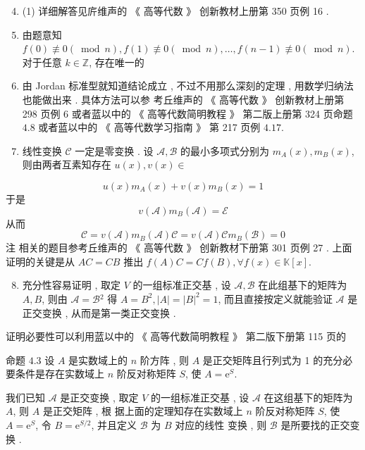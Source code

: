 \documentclass[10pt]{article}
\begin{document}
\begin{enumerate}
  \setcounter{enumi}{3}
  \item (1)  详细解答见庍维声的 《 高等代数 》 创新教材上册第  350  页例  16 .

  \item  由题意知  $f(0) \not \equiv 0(\bmod n), f(1) \not \equiv 0(\bmod n), \ldots, f(n-1) \not \equiv 0(\bmod n)$.  对于任意  $k \in \mathbb{Z}$,  存在唯一的 

  \item  由  Jordan  标准型就知道结论成立 ,  不过不用那么深刻的定理 ,  用数学归纳法也能做出来 .  具体方法可以参   考丘维声的 《 高等代数 》 创新教材上册第  298  页例  6  或者蓝以中的 《 高等代数简明教程 》 第二版上册第  324  页命题  $4.8$  或者蓝以中的 《 高等代数学习指南 》 第  217  页例  $4.17$.

  \item  线性变换  $\mathscr{C}$  一定是零变换 .  设  $\mathscr{A}, \mathscr{B}$  的最小多项式分别为  $m_{A}(x), m_{B}(x)$,  则由两者互素知存在  $u(x), v(x) \in$

\end{enumerate}
$$
u(x) m_{A}(x)+v(x) m_{B}(x)=1
$$
 于是 
$$
v(\mathscr{A}) m_{B}(\mathscr{A})=\mathscr{E}
$$
 从而 
$$
\mathscr{C}=v(\mathscr{A}) m_{B}(\mathscr{A}) \mathscr{C}=v(\mathscr{A}) \mathscr{C} m_{B}(\mathscr{B})=0
$$
 注   相关的题目参考丘维声的 《 高等代数 》 创新教材下册第  301  页例  27 .  上面证明的关键是从  $A C=C B$  推出  $f(A) C=C f(B), \forall f(x) \in \mathbb{K}[x] .$

\begin{enumerate}
  \setcounter{enumi}{7}
  \item  充分性容易证明 ,  取定  $V$  的一组标准正交基 ,  设  $\mathscr{A}, \mathscr{B}$  在此组基下的矩阵为  $A, B$,  则由  $\mathscr{A}=\mathscr{B}{ }^{2}$  得  $A=B^{2},|A|=|B|^{2}=1$,  而且直接按定义就能验证  $\mathscr{A}$  是正交变换 ,  从而是第一类正交变换 .
\end{enumerate}
 证明必要性可以利用蓝以中的 《 高等代数简明教程 》 第二版下册第  115  页的 

 命题  $4.3$  设  $A$  是实数域上的  $n$  阶方阵 ,  则  $A$  是正交矩阵且行列式为  1  的充分必要条件是存在实数域上  $n$  阶反对称矩阵  $S$,  使  $A=\mathrm{e}^{S}$.

 我们已知  $\mathscr{A}$  是正交变换 ,  取定  $V$  的一组标准正交基 ,  设  $\mathscr{A}$  在这组基下的矩阵为  $A$,  则  $A$  是正交矩阵 ,  根   据上面的定理知存在实数域上  $n$  阶反对称矩阵  $S$,  使  $A=\mathrm{e}^{S}$,  令  $B=\mathrm{e}^{S / 2}$,  并且定义  $\mathscr{B}$  为  $B$  对应的线性   变换 ,  则  $\mathscr{B}$  是所要找的正交变换 .
\end{document}
